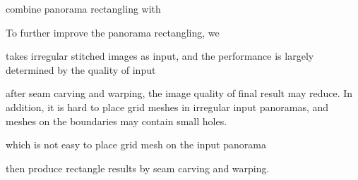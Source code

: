 \documentclass[10pt,journal,compsoc]{IEEEtran}
\begin{document}
combine panorama rectangling with


To further improve the panorama rectangling, we



takes irregular stitched images as input, and the performance is largely determined by the quality of input



after seam carving and warping, the image quality of final result may reduce. In addition, it is hard to place grid meshes in irregular input panoramas, and meshes on the boundaries may contain small holes.



which is not easy to place grid mesh on the input panorama


then produce rectangle results by seam carving and warping.



%






\end{document}
